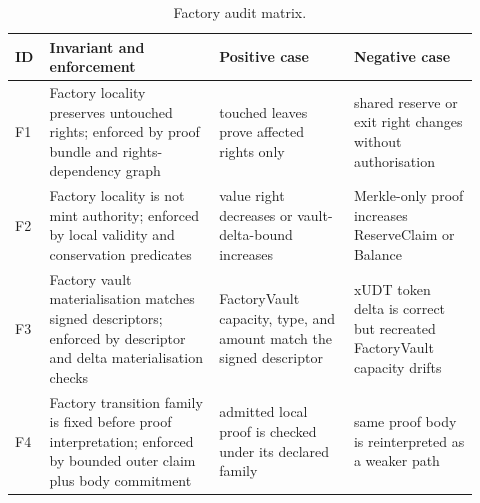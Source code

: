 \documentclass[a4paper,11pt]{article}
\begin{document}
\begin{table}[H]
\centering
\footnotesize
\setlength{\tabcolsep}{4pt}
\begin{tabular}{L{0.06\linewidth}L{0.34\linewidth}L{0.27\linewidth}L{0.25\linewidth}}
\toprule
ID & Invariant and enforcement & Positive case & Negative case \\
\midrule
F1 & Factory locality preserves untouched rights; enforced by proof bundle and rights-dependency graph & touched leaves prove affected rights only & shared reserve or exit right changes without authorisation \\
F2 & Factory locality is not mint authority; enforced by local validity and conservation predicates & value right decreases or vault-delta-bound increases & Merkle-only proof increases ReserveClaim or Balance \\
F3 & Factory vault materialisation matches signed descriptors; enforced by descriptor and delta materialisation checks & FactoryVault capacity, type, and amount match the signed descriptor & xUDT token delta is correct but recreated FactoryVault capacity drifts \\
F4 & Factory transition family is fixed before proof interpretation; enforced by bounded outer claim plus body commitment & admitted local proof is checked under its declared family & same proof body is reinterpreted as a weaker path \\
\bottomrule
\end{tabular}
\caption{Factory audit matrix.}
\label{tab:audit-factory}
\end{table}
\end{document}
